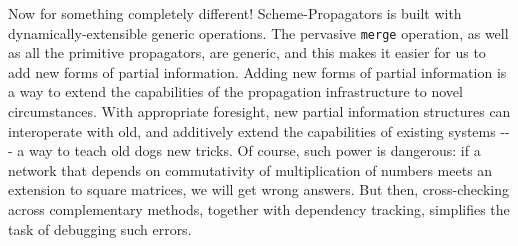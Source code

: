 \documentclass[12pt,letterpaper,english]{article}
\begin{document}
Now for something completely different!  Scheme-Propagators is built
with dynamically-extensible generic operations.  The pervasive
\texttt{merge} operation, as well as all the primitive propagators, are
generic, and this makes it easier for us to add new forms of partial
information.  Adding new forms of partial information is a way to
extend the capabilities of the propagation infrastructure to novel
circumstances.  With appropriate foresight, new partial information
structures can interoperate with old, and additively extend the
capabilities of existing systems -{}-{}- a way to teach old dogs new
tricks.  Of course, such power is dangerous: if a network that depends
on commutativity of multiplication of numbers meets an extension to
square matrices, we will get wrong answers.  But then, cross-checking
across complementary methods, together with dependency tracking,
simplifies the task of debugging such errors.



\end{document}
